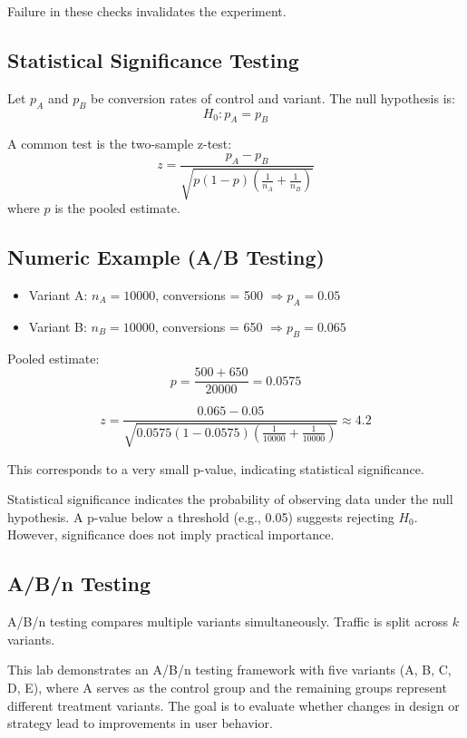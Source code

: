 \documentclass[10pt,a4paper]{article}
\begin{document}
Failure in these checks invalidates the experiment.
	
\subsection{Statistical Significance Testing}

Let $p_A$ and $p_B$ be conversion rates of control and variant. The null hypothesis is:
\[
H_0: p_A = p_B
\]

A common test is the two-sample z-test:
\[
z = \frac{p_A - p_B}{\sqrt{p(1-p)\left(\frac{1}{n_A} + \frac{1}{n_B}\right)}}
\]
where $p$ is the pooled estimate.
	
\subsection{Numeric Example (A/B Testing)}

\begin{itemize}
\item Variant A: $n_A = 10000$, conversions = 500 $\Rightarrow p_A = 0.05$
\item Variant B: $n_B = 10000$, conversions = 650 $\Rightarrow p_B = 0.065$
\end{itemize}

Pooled estimate:
\[
p = \frac{500 + 650}{20000} = 0.0575
\]

\[
z = \frac{0.065 - 0.05}{\sqrt{0.0575(1-0.0575)\left(\frac{1}{10000}+\frac{1}{10000}\right)}} \approx 4.2
\]

This corresponds to a very small p-value, indicating statistical significance.

Statistical significance indicates the probability of observing data under the null hypothesis. A p-value below a threshold (e.g., 0.05) suggests rejecting $H_0$. However, significance does not imply practical importance.



\subsection{A/B/n Testing}

A/B/n testing compares multiple variants simultaneously. Traffic is split across $k$ variants.

This lab demonstrates an A/B/n testing framework with five variants (A, B, C, D, E), where A serves as the control group and the remaining groups represent different treatment variants. The goal is to evaluate whether changes in design or strategy lead to improvements in user behavior.
\end{document}
